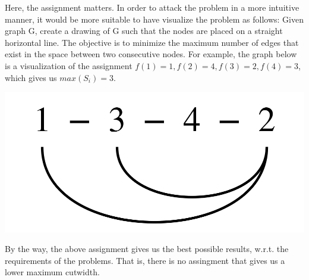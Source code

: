 Here, the assignment matters. In order to attack the problem in a more intuitive manner, it would be more suitable to have visualize the problem as follows: Given graph G, create a drawing of G such that the nodes are placed on a straight horizontal line.
The objective is to minimize the maximum number of edges that exist in the space between two consecutive nodes. 
For example, the graph below is a visualization of the assignment $f(1)=1, f(2)=4,f(3)=2,f(4)=3$, which gives us $max(S_i)=3$.

\begin{center}
\includegraphics[scale=0.1]{img/graph2.png}
\end{center}

By the way, the above assignment gives us the best possible results, w.r.t. the requirements of the problems. That is, there is no assingment that gives us a lower maximum cutwidth. 


